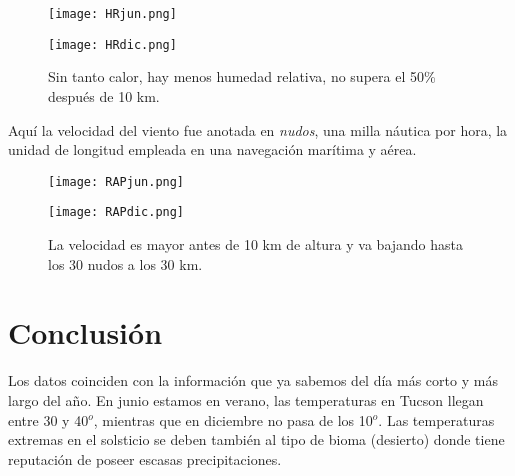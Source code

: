\documentclass[12pt]{article}
\begin{document}
\begin{figure}[H]
  \centering
  \begin{minipage}[b]{0.45\textwidth}
    \texttt{[image: HRjun.png]}
    \caption{\small Hay mucho vapor para la temperatura a la que se llega a sentir en la superficie, esto se debe a las altas temperaturas y alta precipitaci\'on. Junio es temporada de lluvias para \'este lado des\'ertico en el desierto de Arizona/Sonora.}
  \end{minipage}
  \hfill
  \begin{minipage}[b]{0.45\textwidth}
    \texttt{[image: HRdic.png]}
    \caption{\small Sin tanto calor, hay menos humedad relativa, no supera el 50\% despu\'es de 10 km.}
  \end{minipage}
\end{figure}

Aqu\'i la velocidad del viento fue anotada en \emph{nudos}, una milla n\'autica por hora, la unidad de longitud empleada en una navegaci\'on mar\'itima y a\'erea. 
\begin{figure}[H]
  \centering
  \begin{minipage}[b]{0.45\textwidth}
    \texttt{[image: RAPjun.png]}
    \caption{\small La velocidad no pasa los 18 nudos en los primeros 10 kil\'ometros del suelo y es mayor hasta los 30 km de altura.}
  \end{minipage}
  \hfill
  \begin{minipage}[b]{0.45\textwidth}
    \texttt{[image: RAPdic.png]}
    \caption{\small La velocidad es mayor antes de 10 km de altura y va bajando hasta los 30 nudos a los 30 km.}
  \end{minipage}
\end{figure}


\section{Conclusi\'on}
\noindent
Los datos coinciden con la informaci\'on que ya sabemos del d\'ia m\'as corto y m\'as largo del año. En junio estamos en verano, las temperaturas en Tucson llegan entre 30 y 40$^{o}$, mientras que en diciembre no pasa de los 10$^{o}$. Las temperaturas extremas en el solsticio se deben tambi\'en al tipo de bioma (desierto) donde tiene reputaci\'on de poseer escasas precipitaciones. 

\end{document}
